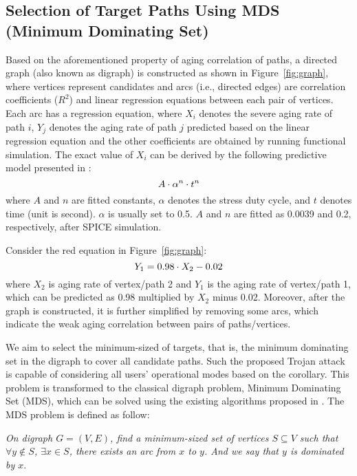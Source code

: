\subsection{Selection of Target Paths Using MDS (Minimum Dominating Set)}
\label{sec:frame:mds}
Based on the aforementioned property of aging correlation of paths, a directed graph (also known as digraph) is constructed as shown in Figure~\ref{fig:graph}, where vertices represent candidates and arcs (i.e., directed edges) are correlation coefficients ($R^2$) and linear regression equations between each pair of vertices. Each arc has a regression equation, where $X_{i}$ denotes the severe aging rate of path $i$, $Y_{j}$ denotes the aging rate of path $j$ predicted based on the linear regression equation and the other coefficients are obtained by running functional simulation. The exact value of $X_{i}$ can be derived by the following predictive model presented in \cite{wang2007efficient}:
\begin{equation}
	\fontsize{8}{8} \selectfont
	A \cdot \alpha^n \cdot t^n 
	\label{eq:worst}
\end{equation}
where $A$ and $n$ are fitted constants, $\alpha$ denotes the stress duty cycle, and $t$ denotes time (unit is second). $\alpha$ is usually set to 0.5. $A$ and $n$ are fitted as 0.0039 and 0.2, respectively, after SPICE simulation.

Consider the red equation in Figure~\ref{fig:graph}:
\begin{equation}
	\centering
	\fontsize{8}{8} \selectfont
	Y_{1} = 0.98 \cdot X_{2} - 0.02
\end{equation}
where $X_{2}$ is aging rate of vertex/path 2 and $Y_{1}$ is the aging rate of vertex/path 1, which can be predicted as 0.98 multiplied by $X_{2}$ minus 0.02.
Moreover, after the graph is constructed, it is further simplified by removing some arcs, which indicate the weak aging correlation between pairs of paths/vertices.

We aim to select the minimum-sized of targets, that is, the minimum dominating set in the digraph to cover all candidate paths. Such the proposed Trojan attack is capable of considering all users' operational modes based on the corollary. This problem is transformed to the classical digraph problem, Minimum Dominating Set (MDS), which can be solved using the existing algorithms proposed in \cite{ore1962theory}\cite{natarajan1978optimum}. The MDS problem is defined as follow:

\textit{On digraph $G = (V, E)$, find a minimum-sized set of vertices $S \subseteq V$ such that $\forall y \notin S$, $\exists x \in S$, there exists an arc from $x$ to $y$. And we say that $y$ is dominated by $x$}.

